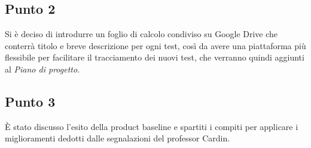     \subsection{Punto 2}
        Si è deciso di introdurre un foglio di calcolo condiviso su Google Drive che conterrà titolo e breve descrizione per ogni test, così da avere una piattaforma più flessibile per facilitare il tracciamento dei nuovi test, che verranno quindi aggiunti al \textit{Piano di progetto}.
    \subsection{Punto 3}
        È stato discusso l'esito della product baseline e spartiti i compiti per applicare i miglioramenti dedotti dalle segnalazioni del professor Cardin.
